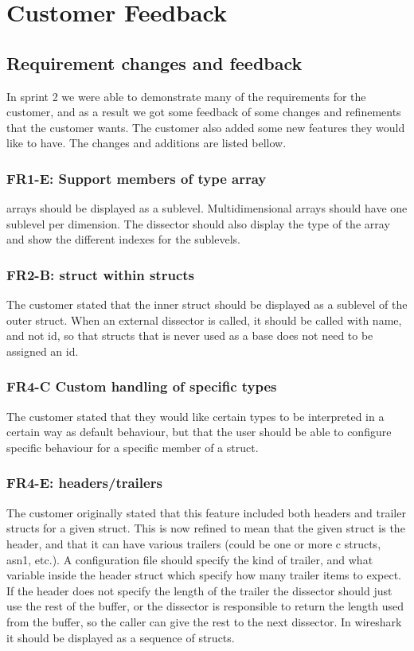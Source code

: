 \section{Customer Feedback}
\subsection{Requirement changes and feedback}
In sprint 2 we were able to demonstrate many of the requirements for the customer, and as a result we got some feedback of some changes and refinements that the customer wants. The customer also added some new features they would like to have. The changes and additions are listed bellow.

\subsubsection{FR1-E: Support \glspl{member} of type \gls{array}}
\Glspl{array} should be displayed as a sublevel. Multidimensional \glspl{array} should have one sublevel per dimension. The \gls{dissector} should also display the type of the \gls{array} and show the different indexes for the sublevels.

\subsubsection{FR2-B: \gls{struct} within \glspl{struct}}
The customer stated that the inner \gls{struct} should be displayed as a sublevel of the outer \gls{struct}.
When an external \gls{dissector} is called, it should be called with name, and not id, so that \glspl{struct} that is never used as a base does not need to be assigned an id.

\subsubsection{FR4-C Custom handling of specific types}
The customer stated that they would like certain types to be interpreted in a certain way as default behaviour, but that the user should be able to configure specific behaviour for a specific \gls{member} of a \gls{struct}.

\subsubsection{FR4-E: \Glspl{header}/\gls{trailers}}
The customer originally stated that this feature included both \glspl{header} and trailer \glspl{struct} for a given \gls{struct}. This is now refined to mean that the given \gls{struct} is the \gls{header}, and that it can have various \gls{trailers} (could be one or more \Gls{c} \glspl{struct}, \gls{asn1}, etc.). A configuration file should specify the kind of trailer, and what variable inside the \gls{header} \gls{struct} which specify how many trailer items to expect. If the \gls{header} does not specify the length of the trailer the \gls{dissector} should just use the rest of the buffer, or the \gls{dissector} is responsible to return the length used from the buffer, so the caller can give the rest to the next \gls{dissector}.
In \Gls{wireshark} it should be displayed as a sequence of \glspl{struct}.

